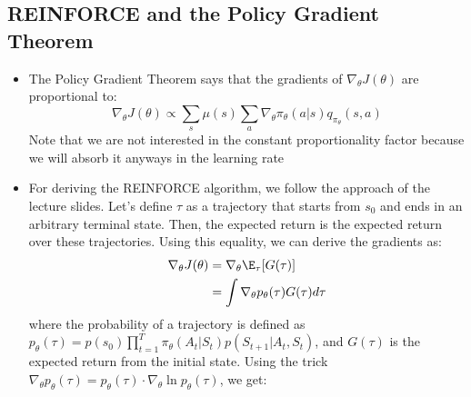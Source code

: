 \subsection{REINFORCE and the Policy Gradient Theorem}
\begin{itemize}
	\item The Policy Gradient Theorem says that the gradients of $\nabla_{\theta}J(\theta)$ are proportional to:
	$$\nabla_{\theta}J(\theta) \propto \sum_s \mu(s) \sum_a \nabla_{\theta} \pi_{\theta}(a|s)q_{\pi_{\theta}}(s,a) $$
	Note that we are not interested in the constant proportionality factor because we will absorb it anyways in the learning rate
	\item For deriving the REINFORCE algorithm, we follow the approach of the lecture slides. Let's define $\tau$ as a trajectory that starts from $s_0$ and ends in an arbitrary terminal state. Then, the expected return is the expected return over these trajectories. Using this equality, we can derive the gradients as:
	\begin{equation*}
		\begin{split}
			\nabla_{\theta}J(\theta) & =  \nabla_{\theta} \E_{\tau}[G(\tau)]\\
			& = \int \nabla_{\theta} p_{\theta}(\tau) G(\tau)d\tau\\
		\end{split}
	\end{equation*}
	where the probability of a trajectory is defined as $p_{\theta}(\tau)=p(s_0)\prod_{t=1}^{T}\pi_{\theta}(A_t|S_t)p(S_{t+1}|A_{t},S_t)$, and $G(\tau)$ is the expected return from the initial state. Using the trick $\nabla_{\theta} p_{\theta}(\tau)=p_{\theta}(\tau)\cdot \nabla_{\theta} \ln p_{\theta}(\tau)$, we get:
	

\end{itemize}

